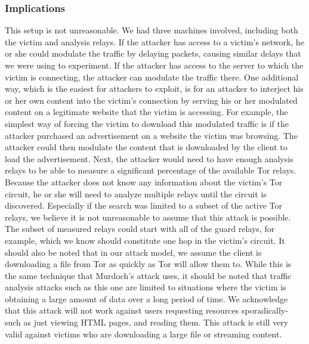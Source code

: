 \documentclass[12pt,journal]{IEEEtran}
\begin{document}
\subsubsection{Implications}
This setup is not unreasonable. We had three machines involved, including both the victim and analysis relays. If the attacker has access to a victim's network, he or she could modulate the traffic by delaying packets, causing similar delays that we were using to experiment. If the attacker has access to the server to which the victim is connecting, the attacker can modulate the traffic there.
One additional way, which is the easiest for attackers to exploit, is for an attacker to interject his or her own content into the victim's connection by serving his or her modulated content on a legitimate website that the victim is accessing. For example, the simplest way of forcing the victim to download this modulated traffic is if the attacker purchased an advertisement on a website the victim was browsing. The attacker could then modulate the content that is downloaded by the client to load the advertisement.
Next, the attacker would need to have enough analysis relays to be able to measure a significant percentage of the available Tor relays. Because the attacker does not know any information about the victim's Tor circuit, he or she will need to analyze multiple relays until the circuit is discovered. Especially if the search was limited to a subset of the active Tor relays, we believe it is not unreasonable to assume that this attack is possible. The subset of measured relays could start with all of the guard relays, for example, which we know should constitute one hop in the victim's circuit. It should also be noted that in our attack model, we assume the client is downloading a file from Tor as quickly as Tor will allow them to. While this is the same technique that Murdoch's attack uses, it should be noted that traffic analysis attacks such as this one are limited to situations where the victim is obtaining a large amount of data over a long period of time. We acknowledge that this attack will not work against users requesting resources sporadically- such as just viewing HTML pages, and reading them. This attack is still very valid against victims who are downloading a large file or streaming content.
\end{document}
